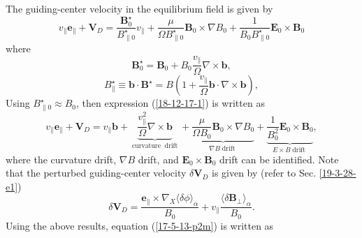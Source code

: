 \documentclass{llncs}
\newcommand{\tmop}[1]{\ensuremath{\operatorname{#1}}}
\begin{document}
The guiding-center velocity in the equilibrium field is given by
\begin{equation}
  \label{18-12-17-1} v_{\parallel} \mathbf{e}_{\parallel} +\mathbf{V}_D =
  \frac{\mathbf{B}^{\star}_0}{B^{\star}_{\parallel 0}} v_{\parallel} +
  \frac{\mu}{\Omega B^{\star}_{\parallel 0}} \mathbf{B}_0 \times \nabla B_0 +
  \frac{1}{B_0 B^{\star}_{\parallel 0}} \mathbf{E}_0 \times \mathbf{B}_0
\end{equation}
where
\begin{equation}
  \mathbf{B}^{\star}_0 =\mathbf{B}_0 + B_0 \frac{v_{\parallel}}{\Omega} \nabla
  \times \mathbf{b},
\end{equation}
\begin{equation}
  \label{5-15-p8} B^{\star}_{\parallel} \equiv \mathbf{b} \cdot
  \mathbf{B}^{\star} = B \left( 1 + \frac{v_{\parallel}}{\Omega} \mathbf{b}
  \cdot \nabla \times \mathbf{b} \right),
\end{equation}
Using $B_{\parallel 0}^{\star} \approx B_0$, then expression
(\ref{18-12-17-1}) is written as
\begin{equation}
  v_{\parallel} \mathbf{e}_{\parallel} +\mathbf{V}_D = v_{\parallel}
  \mathbf{b}+ \underbrace{\frac{v_{\parallel}^2}{\Omega} \nabla \times
  \mathbf{b}}_{\tmop{curvature} \tmop{drift}} + \underbrace{\frac{\mu}{\Omega
  B_0} \mathbf{B}_0 \times \nabla B_0}_{\nabla B \tmop{drift}} +
  \underbrace{\frac{1}{B_0^2} \mathbf{E}_0 \times \mathbf{B}_0}_{E \times B
  \tmop{drift}},
\end{equation}
where the curvature drift, $\nabla B$ drift, and $\mathbf{E}_0 \times
\mathbf{B}_0$ drift can be identified. Note that the perturbed guiding-center
velocity $\delta \mathbf{V}_D$ is given by (refer to Sec. \ref{19-3-28-e1})
\begin{equation}
  \delta \mathbf{V}_D = \frac{\mathbf{e}_{\parallel} \times \nabla_X \langle
  \delta \phi \rangle_{\alpha}}{B_0} + v_{\parallel} \frac{\langle \delta
  \mathbf{B}_{\perp} \rangle_{\alpha}}{B_0} .
\end{equation}
Using the above results, equation (\ref{17-5-13-p2m}) is written as
\end{document}
